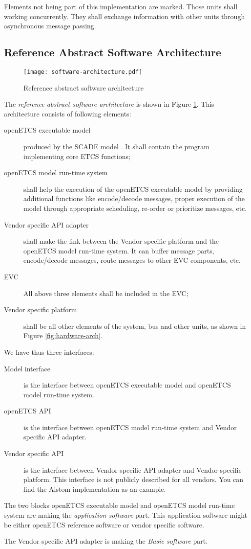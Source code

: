 Elements not being part of this implementation are marked. Those units shall working concurrently. They shall exchange information with other units through asynchronous message passing.

\subsection{Reference Abstract Software Architecture}
\label{software-arch}

\begin{figure}
  \centering
  \texttt{[image: software-architecture.pdf]}
  \caption{Reference abstract software architecture}
  \label{fig:software-arch}
\end{figure}

The \emph{reference abstract software architecture} is shown in Figure
\ref{fig:software-arch}. This architecture consists of following
elements:
\begin{description}
\item[openETCS executable model] produced by the SCADE model \cite{scade-model}. It shall contain the program implementing core
  ETCS functions;
\item[openETCS model run-time system] shall help the execution
  of the openETCS executable model by providing additional functions
  like encode/decode messages, proper execution of the model through
  appropriate scheduling, re-order or prioritize messages, etc. 
\item[Vendor specific API adapter] shall make the link between
  the Vendor specific platform and the openETCS model run-time system.
  It can buffer message parts, encode/decode messages, route messages
  to other EVC components, etc.
\item[EVC] All above three elements shall be included in the EVC;
\item[Vendor specific platform] shall be all other elements of
  the system, bus and other units, as shown in Figure \ref{fig:hardware-arch}.
\end{description}

We have thus three interfaces:
\begin{description}
\item[Model interface]
 is the interface between openETCS executable model and openETCS model run-time system. 
\item[openETCS {API}]
 is the interface between openETCS model run-time system and Vendor specific {API} adapter.
\item[Vendor specific {API}]
 is the interface between Vendor specific {API} adapter and Vendor specific platform. This interface is not publicly described for all vendors. You can find the Alstom implementation as an example.
\end{description}

The two blocks openETCS executable model and openETCS model run-time
system are making the \emph{application software} part. This application software might be either openETCS reference software or vendor specific software.

The Vendor specific API adapter is making the \emph{Basic software} part.



